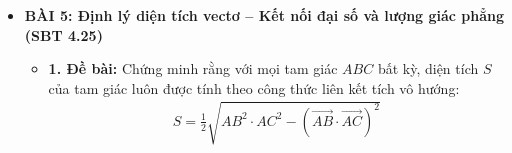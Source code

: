 \documentclass[12pt,a4paper]{article}
\begin{document}
\begin{itemize}
\begin{itemize}
\begin{itemize}
            \item \textit{Bước 3: Khai triển công thức đường trung tuyến}\\
            Áp dụng định lý về công thức độ dài đường trung tuyến trong tam giác:
            \begin{align*}
                m_a^2 = \frac{2(b^2 + c^2) - a^2}{4} \quad \text{và} \quad m_b^2 = \frac{2(a^2 + c^2) - b^2}{4}
            \end{align*}
            Thay các biểu thức này vào đẳng thức ở Bước 2:
            \begin{align*}
                c^2 &= \frac{4}{9} \left[ \frac{2(b^2+c^2)-a^2}{4} + \frac{2(a^2+c^2)-b^2}{4} \right] \\
                c^2 &= \frac{1}{9} \left[ (2b^2 + 2c^2 - a^2) + (2a^2 + 2c^2 - b^2) \right] \\
                c^2 &= \frac{1}{9} \left( a^2 + b^2 + 4c^2 \right)
            \end{align*}
            Quy đồng và nhân chéo hai vế:
            \begin{align*}
                9c^2 = a^2 + b^2 + 4c^2 \Longleftrightarrow 5c^2 = a^2 + b^2
            \end{align*}
        \end{itemize}
        \textbf{Kết luận:} Đẳng thức $5c^2 = a^2 + b^2$ được chứng minh hoàn toàn.
    \end{itemize}

    \vspace{4mm}

    \item \textbf{BÀI 5: Định lý diện tích vectơ -- Kết nối đại số và lượng giác phẳng (SBT 4.25)}
    \begin{itemize}
        \item \textbf{1. Đề bài:}
        Chứng minh rằng với mọi tam giác $ABC$ bất kỳ, diện tích $S$ của tam giác luôn được tính theo công thức liên kết tích vô hướng:
        \begin{align*}
            S = \frac{1}{2}\sqrt{AB^2 \cdot AC^2 - (\vec{AB} \cdot \vec{AC})^2}
        \end{align*}


\end{itemize}
\end{itemize}
\end{document}
